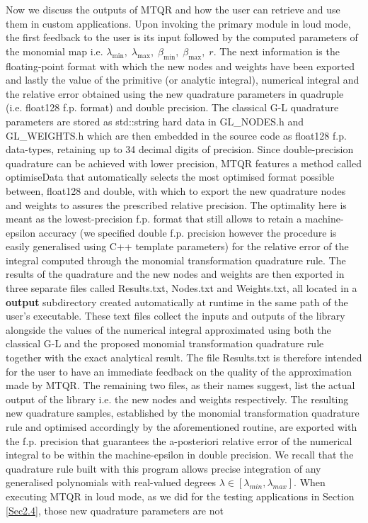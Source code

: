 \documentclass[a4paper, twosided]{book}
\begin{document}
\noindent
 Now we discuss the outputs of MTQR and how the user can retrieve and use them in custom applications. Upon invoking the primary module in loud mode, the first feedback to the user is its input followed by the computed parameters of the monomial map i.e. $\lambda_{\text{min}},\;\lambda_{\text{max}},\;\beta_{\text{min}},\;\beta_{\text{max}},\;r$. The next information is the floating-point format with which the new nodes and weights have been exported and lastly the value of the primitive (or analytic integral), numerical integral and the relative error obtained using the new quadrature parameters in quadruple (i.e. \colorbox{poliGrayBlue}{float128} f.p. format) and \colorbox{poliGrayBlue}{double} precision. The classical G-L quadrature parameters are stored as \colorbox{poliGrayBlue}{std::string} hard data in \colorbox{poliGrayBlue}{GL\_NODES.h} and \colorbox{poliGrayBlue}{GL\_WEIGHTS.h} which are then embedded in the source code as \colorbox{poliGrayBlue}{float128} f.p. data-types, retaining up to 34 decimal digits of precision. Since double-precision quadrature can be achieved with lower precision, MTQR features a method called \colorbox{poliGrayBlue}{optimiseData} that automatically selects the most optimised format possible between, \colorbox{poliGrayBlue}{float128} and \colorbox{poliGrayBlue}{double}, with which to export the new quadrature nodes and weights to assures the prescribed relative precision. The optimality here is meant as the lowest-precision f.p. format that still allows to retain a machine-epsilon accuracy (we specified double f.p. precision however the procedure is easily generalised using C++ template parameters) for the relative error of the integral computed through the monomial  transformation quadrature rule. The results of the quadrature and the new nodes and weights are then exported in three separate files called \colorbox{poliGrayBlue}{Results.txt}, \colorbox{poliGrayBlue}{Nodes.txt} and \colorbox{poliGrayBlue}{Weights.txt}, all located in a \colorbox{poliGrayBlue}{\textbf{ output}} subdirectory created automatically at runtime in the same path of the user's executable. These text files collect the inputs and outputs of the library alongside the values of the numerical integral approximated using both the classical G-L and the proposed monomial transformation quadrature rule together with the exact analytical result. The file \colorbox{poliGrayBlue}{Results.txt} is therefore intended for the user to have an immediate feedback on the quality of the approximation made by MTQR. The remaining two files, as their names suggest, list the actual output of the library i.e. the new nodes and weights respectively. The resulting new quadrature samples, established by the monomial transformation quadrature rule and optimised accordingly by the aforementioned routine, are exported with the f.p. precision that guarantees the a-posteriori relative error of the numerical integral to be within the machine-epsilon in double precision. We recall that the quadrature rule built with this program allows precise integration of any generalised polynomials with real-valued degrees $\lambda \in [\lambda_{min},\lambda_{max}]$. When executing MTQR in loud mode, as we did for the testing applications in Section \ref{Sec2.4}, those new quadrature parameters are not 
\end{document}
